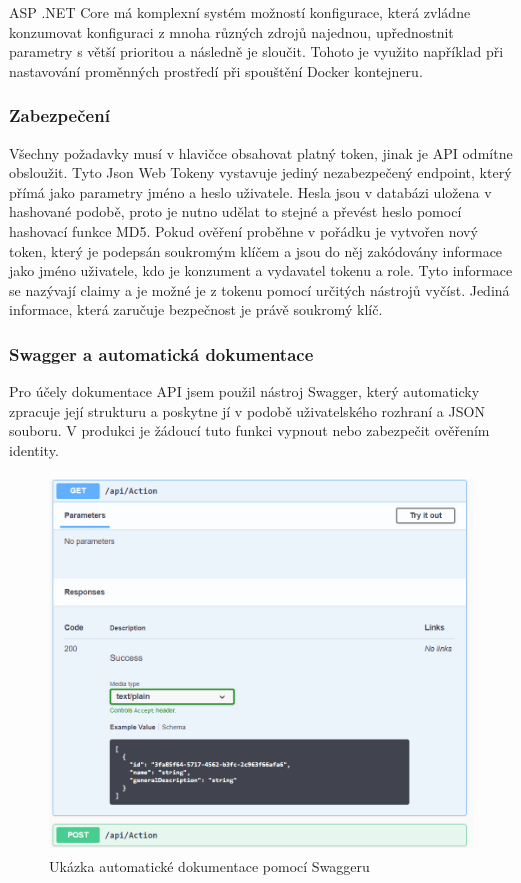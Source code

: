 \documentclass[
  biblatex,
  glossaries,
  index
]{kidiplom}
\begin{document}
ASP .NET Core má komplexní systém možností konfigurace, která zvládne konzumovat konfiguraci z mnoha různých zdrojů najednou, upřednostnit parametry s větší prioritou a následně je sloučit. Tohoto je využito například při nastavování proměnných prostředí při spouštění Docker kontejneru.

\subsubsection{Zabezpečení}
Všechny požadavky musí v hlavičce obsahovat platný token, jinak je API odmítne obsloužit. Tyto Json Web Tokeny vystavuje jediný nezabezpečený endpoint, který přímá jako parametry jméno a heslo uživatele. Hesla jsou v databázi uložena v hashované podobě, proto je nutno udělat to stejné a převést heslo pomocí hashovací funkce MD5. Pokud ověření proběhne v pořádku je vytvořen nový token, který je podepsán soukromým klíčem a jsou do něj zakódovány informace jako jméno uživatele, kdo je konzument a vydavatel tokenu a role. Tyto informace se nazývají claimy a je možné je z tokenu pomocí určitých nástrojů vyčíst. Jediná informace, která zaručuje bezpečnost je právě soukromý klíč. 

\subsubsection{Swagger a automatická dokumentace}
Pro účely dokumentace API jsem použil nástroj Swagger, který automaticky zpracuje její strukturu a poskytne jí v podobě uživatelského rozhraní a JSON souboru. V produkci je žádoucí tuto funkci vypnout nebo zabezpečit ověřením identity.

\begin{figure}[H]
  	\centering
 	 \includegraphics[width=14cm,height=10cm,keepaspectratio]{Swagger_UI}
 	 \caption{Ukázka automatické dokumentace pomocí Swaggeru}
\end{figure}
\end{document}
